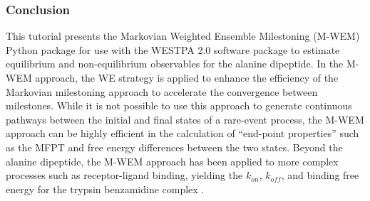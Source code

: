 \subsubsection{Conclusion}
This tutorial presents the Markovian Weighted Ensemble Milestoning (M-WEM) Python package for use with the WESTPA 2.0 software package to estimate equilibrium and non-equilibrium observables for the alanine dipeptide. 
In the M-WEM approach, the WE strategy is applied to enhance the efficiency of the Markovian milestoning approach to accelerate the convergence between milestones.
While it is not possible to use this approach to generate continuous pathways between the initial and final states of a rare-event process, the M-WEM approach can be highly efficient in the calculation of  “end-point properties” such as the MFPT and free energy differences between the two states. 
Beyond the alanine dipeptide, the M-WEM approach has been applied to more complex processes such as receptor-ligand binding, yielding the $k_{on}$, $k_{off}$, and binding free energy for the trypsin benzamidine complex \citep{Ray2022Markovian}.